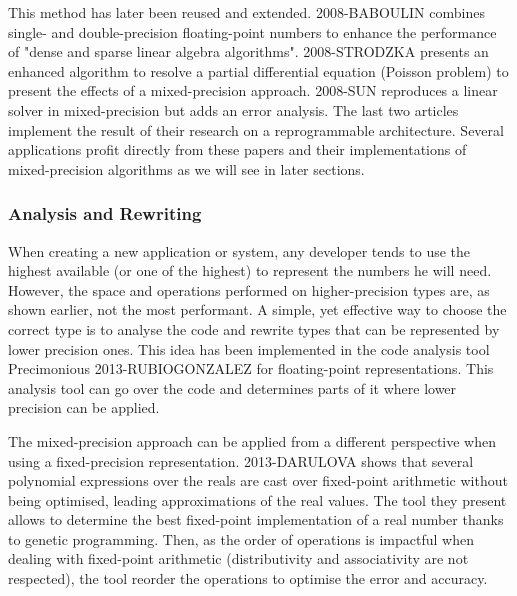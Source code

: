 
This method has later been reused and extended. 2008-BABOULIN combines single- and double-precision floating-point numbers to enhance the performance of "dense and sparse linear algebra algorithms". 2008-STRODZKA presents an enhanced algorithm to resolve a partial differential equation (Poisson problem) to present the effects of a mixed-precision approach. 2008-SUN reproduces a linear solver in mixed-precision but adds an error analysis. The last two articles implement the result of their research on a reprogrammable architecture. Several applications profit directly from these papers and their implementations of mixed-precision algorithms as we will see in later sections.

\subsubsection{Analysis and Rewriting}

When creating a new application or system, any developer tends to use the highest available (or one of the highest) to represent the numbers he will need. However, the space and operations performed on higher-precision types are, as shown earlier, not the most performant. A simple, yet effective way to choose the correct type is to analyse the code and rewrite types that can be represented by lower precision ones. This idea has been implemented in the code analysis tool Precimonious 2013-RUBIOGONZALEZ for floating-point representations. This analysis tool can go over the code and determines parts of it where lower precision can be applied.

The mixed-precision approach can be applied from a different perspective when using a fixed-precision representation. 2013-DARULOVA shows that several polynomial expressions over the reals are cast over fixed-point arithmetic without being optimised, leading approximations of the real values. The tool they present allows to determine the best fixed-point implementation of a real number thanks to genetic programming. Then, as the order of operations is impactful when dealing with fixed-point arithmetic (distributivity and associativity are not respected), the tool reorder the operations to optimise the error and accuracy.

